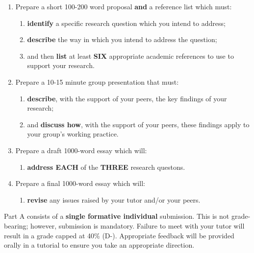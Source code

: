 \documentclass{../fal_assignment}
\begin{document}
\begin{enumerate}[label=(\alph*)]
    \item Prepare a short 100-200 word proposal \textbf{and} a reference list which must:
    	\begin{enumerate}[label=\roman*.]
    		\item \textbf{identify} a specific research question which you intend to address;
    		\item \textbf{describe} the way in which you intend to address the question;
    		\item and then \textbf{list} at least \textbf{SIX} appropriate academic references to use to support your research.
	\end{enumerate}
    \item Prepare a 10-15 minute group presentation that must:
    	\begin{enumerate}[label=\roman*.]
    		\item \textbf{describe}, with the support of your peers, the key findings of your research;
    		\item and \textbf{discuss how}, with the support of your peers, these findings apply to your group's working practice.
	\end{enumerate}
    \item Prepare a draft 1000-word essay which will:
    	\begin{enumerate}[label=\roman*.]
    		\item \textbf{address EACH} of the \textbf{THREE} research questons.
	\end{enumerate}
    \item Prepare a final 1000-word essay which will:
    	\begin{enumerate}[label=\roman*.]
    		\item \textbf{revise} any issues raised by your tutor and/or your peers.
	\end{enumerate}
\end{enumerate}

Part A consists of a \textbf{single formative individual} submission. This is not grade-bearing; however, submission is mandatory. Failure to meet with your tutor will result in a grade capped at 40\% (D-). Appropriate feedback will be provided orally in a tutorial to ensure you take an appropriate direction.


\end{document}
